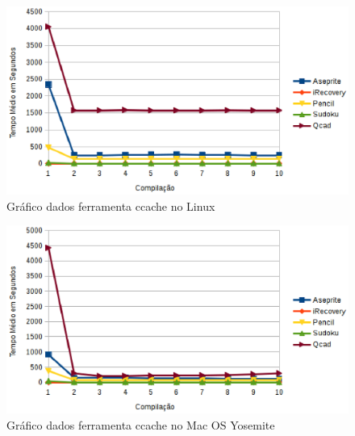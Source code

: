 \begin{apendicesenv}
        \begin{figure}[!h]
            \centering
                \includegraphics{figuras/graficos/linux_ccache.eps}
            \caption{Gráfico dados ferramenta ccache no Linux}
            \label{grafico_ccache_linux}
        \end{figure}

        \begin{figure}[!h]
            \centering
                \includegraphics{figuras/graficos/mac_os_ccache.eps}
            \caption{Gráfico dados ferramenta ccache no Mac OS Yosemite}
            \label{grafico_ccache_mac_os}
        \end{figure}


\end{apendicesenv}
